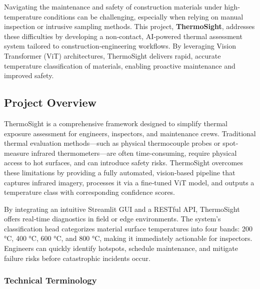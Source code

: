 \noindent Navigating the maintenance and safety of construction materials under high‐temperature conditions can be challenging, especially when relying on manual inspection or intrusive sampling methods. This project, \textbf{ThermoSight}, addresses these difficulties by developing a non‐contact, AI‐powered thermal assessment system tailored to construction‐engineering workflows. By leveraging Vision Transformer (ViT) architectures, ThermoSight delivers rapid, accurate temperature classification of materials, enabling proactive maintenance and improved safety.

\subsection{Project Overview}
ThermoSight is a comprehensive framework designed to simplify thermal exposure assessment for engineers, inspectors, and maintenance crews. Traditional thermal evaluation methods—such as physical thermocouple probes or spot‐measure infrared thermometers—are often time‐consuming, require physical access to hot surfaces, and can introduce safety risks. ThermoSight overcomes these limitations by providing a fully automated, vision‐based pipeline that captures infrared imagery, processes it via a fine‐tuned ViT model, and outputs a temperature class with corresponding confidence scores.

By integrating an intuitive Streamlit GUI and a RESTful API, ThermoSight offers real‐time diagnostics in field or edge environments. The system’s classification head categorizes material surface temperatures into four bands: 200 °C, 400 °C, 600 °C, and 800 °C, making it immediately actionable for inspectors. Engineers can quickly identify hotspots, schedule maintenance, and mitigate failure risks before catastrophic incidents occur.

\subsubsection*{Technical Terminology}

